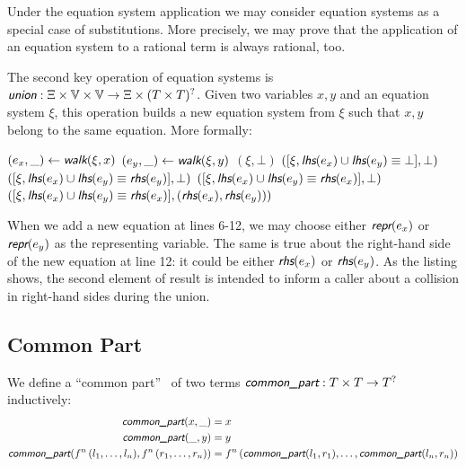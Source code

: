 Under the equation system application we may consider equation systems as a special case of substitutions. More precisely, we may prove that the application of an equation system to a rational term is always rational, too.

The second key operation of equation systems is $\union : \Xi \times \V \times \V \rightarrow \Xi \times (T \times T)^?$. Given two variables $x, y$ and an equation system $\xi$, this operation builds a new equation system from $\xi$ such that $x, y$ belong to the same equation. More formally:
\begin{algorithmic}[1]
        \State $(e_x, \_) \gets \walk(\xi, x)$
        \State $(e_y, \_) \gets \walk(\xi, y)$
            \State \Return $(\xi, \bot)$
        \EndIf
            \State \Return $([\xi, \lhs(e_x) \cup \lhs(e_y) \equiv \bot], \bot)$
        \EndIf
            \State \Return $([\xi, \lhs(e_x) \cup \lhs(e_y) \equiv \rhs(e_y)], \bot)$
        \EndIf
            \State \Return $([\xi, \lhs(e_x) \cup \lhs(e_y) \equiv \rhs(e_x)], \bot)$
        \EndIf
        \State \Return $([\xi, \lhs(e_x) \cup \lhs(e_y) \equiv \rhs(e_x)],(\rhs(e_x), \rhs(e_y)))$
    \EndFunction
\end{algorithmic}

When we add a new equation at lines 6-12, we may choose either $\repr(e_x)$ or $\repr(e_y)$ as the representing variable. The same is true about the right-hand side of the new equation at line 12: it could be either $\rhs(e_x)$ or $\rhs(e_y)$. As the listing shows, the second element of \union result is intended to inform a caller about a collision in right-hand sides during the union.


\subsection{Common Part}

We define a ``common part''~\cite{martelli1984efficient} of two terms $\commonpart : T \times T \rightarrow T^?$ inductively:
\begin{equation*}
    \begin{split}
        \commonpart(x, \_) &= x \\
        \commonpart(\_, y) &= y \\
        \commonpart(f^n\,(l_1, \dots, l_n), f^n\,(r_1, \dots, r_n)) &= f^n\,(\commonpart(l_1, r_1), \dots, \commonpart(l_n, r_n)) \\
    \end{split}
\end{equation*}

